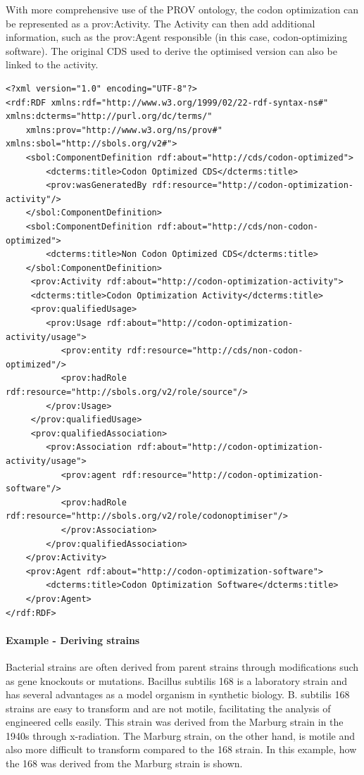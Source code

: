 With more comprehensive use of the PROV ontology, the codon optimization can be represented as a prov:Activity. The Activity can then add additional information, such as the prov:Agent responsible (in this case, codon-optimizing software). The original CDS used to derive the optimised version can also be linked to the activity.
\begin{lstlisting}
<?xml version="1.0" encoding="UTF-8"?>
<rdf:RDF xmlns:rdf="http://www.w3.org/1999/02/22-rdf-syntax-ns#" xmlns:dcterms="http://purl.org/dc/terms/"
    xmlns:prov="http://www.w3.org/ns/prov#" xmlns:sbol="http://sbols.org/v2#">
    <sbol:ComponentDefinition rdf:about="http://cds/codon-optimized">
        <dcterms:title>Codon Optimized CDS</dcterms:title>
        <prov:wasGeneratedBy rdf:resource="http://codon-optimization-activity"/>                  
    </sbol:ComponentDefinition>
    <sbol:ComponentDefinition rdf:about="http://cds/non-codon-optimized">
        <dcterms:title>Non Codon Optimized CDS</dcterms:title>
    </sbol:ComponentDefinition>
     <prov:Activity rdf:about="http://codon-optimization-activity">
     <dcterms:title>Codon Optimization Activity</dcterms:title>
     <prov:qualifiedUsage>
        <prov:Usage rdf:about="http://codon-optimization-activity/usage">
           <prov:entity rdf:resource="http://cds/non-codon-optimized"/>
           <prov:hadRole rdf:resource="http://sbols.org/v2/role/source"/>
        </prov:Usage>
     </prov:qualifiedUsage>
     <prov:qualifiedAssociation>
        <prov:Association rdf:about="http://codon-optimization-activity/usage">
           <prov:agent rdf:resource="http://codon-optimization-software"/>
           <prov:hadRole rdf:resource="http://sbols.org/v2/role/codonoptimiser"/>
           </prov:Association>
        </prov:qualifiedAssociation>    
    </prov:Activity>
    <prov:Agent rdf:about="http://codon-optimization-software">
        <dcterms:title>Codon Optimization Software</dcterms:title>
    </prov:Agent>
</rdf:RDF>
\end{lstlisting}


\paragraph{Example - Deriving strains}
Bacterial strains are often derived from parent strains through modifications such as gene knockouts or mutations. Bacillus subtilis 168 is a laboratory strain and has several advantages as a model organism in synthetic biology. B. subtilis 168 strains are easy to transform and are not motile, facilitating the analysis of engineered cells easily. This strain was derived from the Marburg strain in the 1940s through x-radiation. The Marburg strain, on the other hand, is motile and also more difficult to transform compared to the 168 strain. In this example, how the 168 was derived from the Marburg strain is shown.

